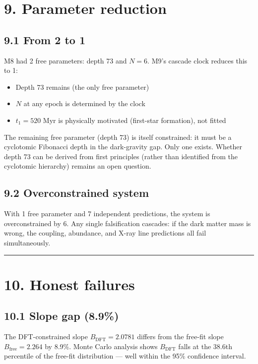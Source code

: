 \documentclass[11pt,a4paper]{article}
\providecommand{\tightlist}{\setlength{\itemsep}{0pt}\setlength{\parskip}{0pt}}
\begin{document}
\section*{9. Parameter reduction}

\subsection*{9.1 From 2 to 1}

M8 had 2 free parameters: depth 73 and $N = 6$. M9's cascade clock reduces this to 1:
\begin{itemize}\tightlist
\item Depth 73 remains (the only free parameter)
\item $N$ at any epoch is determined by the clock
\item $t_1 = 520$ Myr is physically motivated (first-star formation), not fitted
\end{itemize}

The remaining free parameter (depth 73) is itself constrained: it must be a cyclotomic Fibonacci depth in the dark-gravity gap. Only one exists. Whether depth 73 can be derived from first principles (rather than identified from the cyclotomic hierarchy) remains an open question.

\subsection*{9.2 Overconstrained system}

With 1 free parameter and 7 independent predictions, the system is overconstrained by 6. Any single falsification cascades: if the dark matter mass is wrong, the coupling, abundance, and X-ray line predictions all fail simultaneously.

\begin{center}\rule{0.5\linewidth}{0.4pt}\end{center}

\section*{10. Honest failures}

\subsection*{10.1 Slope gap (8.9\%)}

The DFT-constrained slope $B_{\text{DFT}} = 2.0781$ differs from the free-fit slope $B_{\text{free}} = 2.264$ by 8.9\%. Monte Carlo analysis shows $B_{\text{DFT}}$ falls at the 38.6th percentile of the free-fit distribution — well within the 95\% confidence interval.
\end{document}
